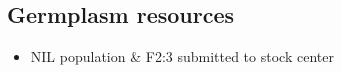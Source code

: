 \subsection{Germplasm resources} %
\begin{itemize}
\item NIL population \& F2:3 submitted to stock center
\end{itemize}




